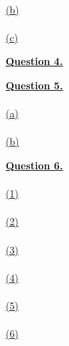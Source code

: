 \documentclass[12pt]{article}
\begin{document}
~\\\hyperlink{toc}{\hypertarget{3.2}{(b)}}\\

~\\\hyperlink{toc}{\hypertarget{3.3}{(c)}}\\
\newpage

\hyperlink{toc}{\hypertarget{4}{\LARGE \underline{\textbf{Question 4.}}}}\\
\newpage

\hyperlink{toc}{\LARGE \underline{\textbf{Question 5.}}}\\
~\\\hyperlink{toc}{\hypertarget{5.1}{(a)}}\\

~\\\hyperlink{toc}{\hypertarget{5.2}{(b)}}\\
\newpage

\hyperlink{toc}{\LARGE \underline{\textbf{Question 6.}}}\\
~\\\hyperlink{toc}{\hypertarget{6.1}{(1)}}\\

~\\\hyperlink{toc}{\hypertarget{6.2}{(2)}}\\

~\\\hyperlink{toc}{\hypertarget{6.3}{(3)}}\\

~\\\hyperlink{toc}{\hypertarget{6.4}{(4)}}\\

~\\\hyperlink{toc}{\hypertarget{6.5}{(5)}}\\

~\\\hyperlink{toc}{\hypertarget{6.6}{(6)}}\\
\end{document}
